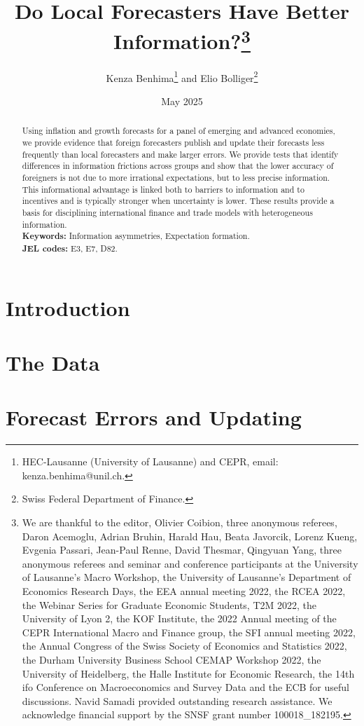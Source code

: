 \documentclass[letterpaper,12pt]{article}
\title{Do Local Forecasters Have Better Information?\thanks{We are thankful to the editor, Olivier Coibion, three anonymous referees, Daron Acemoglu, Adrian Bruhin, Harald Hau, Beata Javorcik, Lorenz Kueng, Evgenia Passari, Jean-Paul Renne, David Thesmar, Qingyuan Yang, three anonymous referees and seminar and conference participants at the University of Lausanne's Macro Workshop, the University of Lausanne's Department of Economics Research Days, the EEA annual meeting 2022, the RCEA 2022, the Webinar Series for Graduate Economic Students, T2M 2022, the University of Lyon 2, the KOF Institute, the 2022 Annual meeting of the CEPR International Macro and Finance group, the SFI annual meeting 2022, the Annual Congress of the Swiss Society of Economics and Statistics 2022, the Durham University Business School CEMAP Workshop 2022, the University of Heidelberg, the Halle Institute for Economic Research, the 14th ifo Conference on Macroeconomics and Survey Data and the ECB for useful discussions. Navid Samadi provided outstanding research assistance. We acknowledge financial support by the SNSF grant number 100018\_182195.}}
\author{Kenza Benhima\footnote{HEC-Lausanne (University of Lausanne) and CEPR, email: kenza.benhima@unil.ch.} and Elio Bolliger\footnote{Swiss Federal Department of Finance.} }
\date{}
\date{May 2025}%
\begin{document}
\vspace{-1cm}
\maketitle


\vspace{-1cm}
\begin{abstract}
\begin{singlespace}
Using inflation and growth forecasts for a panel of emerging and advanced economies, we provide evidence that foreign forecasters publish and update their forecasts less frequently than local forecasters and make larger errors. We provide tests that identify differences in information frictions across groups and show that the lower accuracy of foreigners is not due to more irrational expectations, but to less precise information. This informational advantage is linked both to barriers to information and to incentives and is typically stronger when uncertainty is lower. These results provide a basis for disciplining international finance and trade models with heterogeneous information.\\
\textbf{Keywords:} Information asymmetries, Expectation formation. \\
\textbf{JEL codes:} E3, E7, D82.
\end{singlespace}

\end{abstract}


\newpage

\setcounter{page}{1}

\section{Introduction}


\section{The Data}\label{sec:data}


\section{Forecast Errors and Updating}\label{sec:mistakes}



\end{document}
